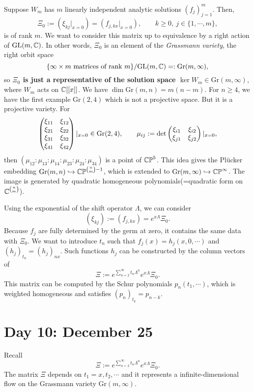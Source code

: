 \documentclass{../../../small}
\newcommand{\Gr}{\mathrm{Gr}}
\begin{document}
Suppose $W_m$ has $m$ linearly independent analytic solutions $(f_j)_{j=1}^m$.
Then,
\[\Xi_0:=(\xi_{kj}|_{x=0})=(f_{j,kx}|_{x=0}),\qquad k\ge0,\ j\in\{1,\cdots,m\},\]
is of rank $m$.
We want to consider this matrix up to equivalence by a right action of $\mathrm{GL}(m,\mathbb{C})$.
In other words, $\Xi_0$ is an element of the \emph{Grassmann variety}, the right orbit space
\[\{\infty\times m\text{ matrices of rank }m\}/\GL(m,\C)=:\Gr(m,\infty),\]
so \textbf{$\Xi_0$ is just a representative of the solution space $\ker W_m\in\Gr(m,\infty)$}, where $W_m$ acts on $\mathbb{C}[[x]]$.
We have $\dim\Gr(m,n)=m(n-m)$.
For $n\ge4$, we have the first example $\Gr(2,4)$ which is not a projective space.
But it is a projective variety.
For
\[\mat{\xi_{11}&\xi_{12}\\\xi_{21}&\xi_{22}\\\xi_{31}&\xi_{32}\\\xi_{41}&\xi_{42}}|_{x=0}\in\Gr(2,4),\qquad \mu_{ij}:=\det\mat{\xi_{i1}&\xi_{i2}\\\xi_{j1}&\xi_{j2}}|_{x=0},\]
then $(\mu_{12}:\mu_{13}:\mu_{14}:\mu_{23}:\mu_{24}:\mu_{34})$ is a point of $\mathbb{CP}^5$.
This idea gives the Pl\"ucker embedding $\Gr(m,n)\hookrightarrow\CP^{{n\choose m}-1}$, which is extended to $\Gr(m,\infty)\hookrightarrow\CP^\infty$.
The image is generated by quadratic homogeneous polynomials(=quadratic form on $\mathbb{C}^{{n\choose m}}$).

Using the exponential of the shift operator $\Lambda$, we can consider
\[(\xi_{kj}):=(f_{j,kx})=e^{x\Lambda}\Xi_0.\]
Because $f_j$ are fully determined by the germ at zero, it contains the same data with $\Xi_0$.
We want to introduce $t_n$ such that $f_j(x)=h_j(x,0,\cdots)$ and $(h_j)_{t_n}=(h_j)_{nx}$.
Such functions $h_j$ can be constructed by the column vectors of
\[\Xi:=e^{\sum_{n=2}^\infty t_n\Lambda^n}e^{x\Lambda}\Xi_0.\]
This matrix can be computed by the Schur polynomials $p_n(t_1,\cdots)$, which is weighted homogeneous and satisfies $(p_n)_{t_k}=p_{n-k}$.



\newpage

\section{Day 10: December 25}
Recall
\[\Xi:=e^{\sum_{n=2}^\infty t_n\Lambda^n}e^{x\Lambda}\Xi_0.\]
The matrix $\Xi$ depends on $t_1=x,t_2,\cdots$ and it represents a infinite-dimensional flow on the Grassmann variety $\Gr(m,\infty)$.
\end{document}
